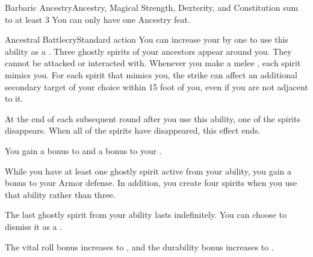  \begin{magicalfeat}{Barbaric Ancestry}{Ancestry, Magical}
    \featpre Strength, Dexterity, and Constitution sum to at least 3
     You can only have one Ancestry feat.

    \begin{magicalactiveability}{Ancestral Battlecry}{Standard action}
      \abilitytags \atSwift
      \abilitycost You can increase your  by one to use this ability as a .
      \rankline
      Three ghostly spirits of your ancestors appear around you.
      They cannot be attacked or interacted with.
      Whenever you make a melee , each spirit mimics you.
      For each spirit that mimics you, the strike can affect an additional secondary target of your choice within 15 foot  of you, even if you are not adjacent to it.

      At the end of each subsequent round after you use this ability, one of the spirits disappears.
      When all of the spirits have disappeared, this effect ends.
    \end{magicalactiveability}

     You gain a  bonus to  and a  bonus to your .

     While you have at least one ghostly spirit active from your  ability, you gain a  bonus to your Armor defense.
    In addition, you create four spirits when you use that ability rather than three.

     The last ghostly spirit from your  ability lasts indefinitely.
    You can choose to dismiss it as a .

     The vital roll bonus increases to , and the durability bonus increases to .
  \end{magicalfeat}

